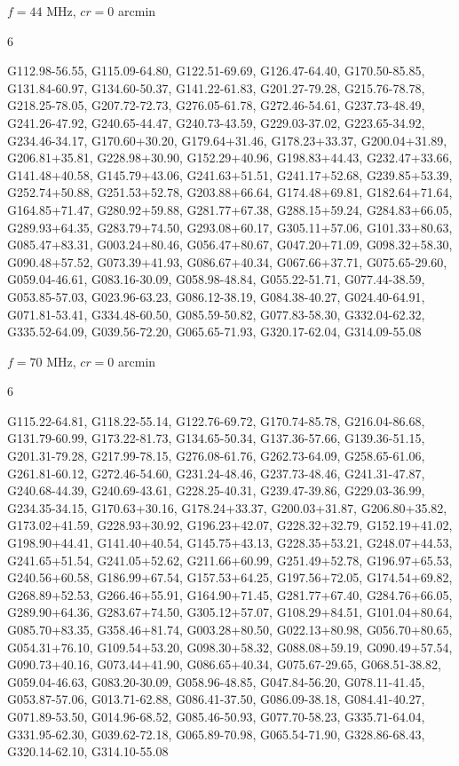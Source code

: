 \documentclass[12pt,a4paper]{article}
\newcommand{\numofcol}{6}
\begin{document}
$f = 44$ MHz, $cr = 0$ arcmin
\begin{multicols}{\numofcol}
\raggedright
\footnotesize 
G112.98-56.55, G115.09-64.80, G122.51-69.69, G126.47-64.40, G170.50-85.85, G131.84-60.97, G134.60-50.37, G141.22-61.83, G201.27-79.28, G215.76-78.78, G218.25-78.05, G207.72-72.73, G276.05-61.78, G272.46-54.61, G237.73-48.49, G241.26-47.92, G240.65-44.47, G240.73-43.59, G229.03-37.02, G223.65-34.92, G234.46-34.17, G170.60+30.20, G179.64+31.46, G178.23+33.37, G200.04+31.89, G206.81+35.81, G228.98+30.90, G152.29+40.96, G198.83+44.43, G232.47+33.66, G141.48+40.58, G145.79+43.06, G241.63+51.51, G241.17+52.68, G239.85+53.39, G252.74+50.88, G251.53+52.78, G203.88+66.64, G174.48+69.81, G182.64+71.64, G164.85+71.47, G280.92+59.88, G281.77+67.38, G288.15+59.24, G284.83+66.05, G289.93+64.35, G283.79+74.50, G293.08+60.17, G305.11+57.06, G101.33+80.63, G085.47+83.31, G003.24+80.46, G056.47+80.67, G047.20+71.09, G098.32+58.30, G090.48+57.52, G073.39+41.93, G086.67+40.34, G067.66+37.71, G075.65-29.60, G059.04-46.61, G083.16-30.09, G058.98-48.84, G055.22-51.71, G077.44-38.59, G053.85-57.03, G023.96-63.23, G086.12-38.19, G084.38-40.27, G024.40-64.91, G071.81-53.41, G334.48-60.50, G085.59-50.82, G077.83-58.30, G332.04-62.32, G335.52-64.09, G039.56-72.20, G065.65-71.93, G320.17-62.04, G314.09-55.08
\end{multicols}

$f = 70$ MHz, $cr = 0$ arcmin
\begin{multicols}{\numofcol}
\raggedright
\footnotesize 
G115.22-64.81, G118.22-55.14, G122.76-69.72, G170.74-85.78, G216.04-86.68, G131.79-60.99, G173.22-81.73, G134.65-50.34, G137.36-57.66, G139.36-51.15, G201.31-79.28, G217.99-78.15, G276.08-61.76, G262.73-64.09, G258.65-61.06, G261.81-60.12, G272.46-54.60, G231.24-48.46, G237.73-48.46, G241.31-47.87, G240.68-44.39, G240.69-43.61, G228.25-40.31, G239.47-39.86, G229.03-36.99, G234.35-34.15, G170.63+30.16, G178.24+33.37, G200.03+31.87, G206.80+35.82, G173.02+41.59, G228.93+30.92, G196.23+42.07, G228.32+32.79, G152.19+41.02, G198.90+44.41, G141.40+40.54, G145.75+43.13, G228.35+53.21, G248.07+44.53, G241.65+51.54, G241.05+52.62, G211.66+60.99, G251.49+52.78, G196.97+65.53, G240.56+60.58, G186.99+67.54, G157.53+64.25, G197.56+72.05, G174.54+69.82, G268.89+52.53, G266.46+55.91, G164.90+71.45, G281.77+67.40, G284.76+66.05, G289.90+64.36, G283.67+74.50, G305.12+57.07, G108.29+84.51, G101.04+80.64, G085.70+83.35, G358.46+81.74, G003.28+80.50, G022.13+80.98, G056.70+80.65, G054.31+76.10, G109.54+53.20, G098.30+58.32, G088.08+59.19, G090.49+57.54, G090.73+40.16, G073.44+41.90, G086.65+40.34, G075.67-29.65, G068.51-38.82, G059.04-46.63, G083.20-30.09, G058.96-48.85, G047.84-56.20, G078.11-41.45, G053.87-57.06, G013.71-62.88, G086.41-37.50, G086.09-38.18, G084.41-40.27, G071.89-53.50, G014.96-68.52, G085.46-50.93, G077.70-58.23, G335.71-64.04, G331.95-62.30, G039.62-72.18, G065.89-70.98, G065.54-71.90, G328.86-68.43, G320.14-62.10, G314.10-55.08
\end{multicols}
\end{document}
